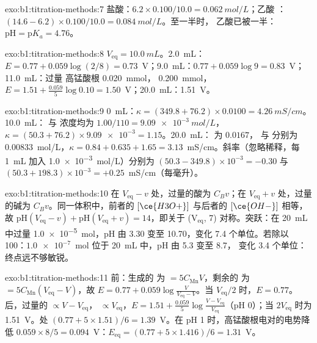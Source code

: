 \begin{solution}{exo:b1:titration-methods:7}
盐酸：$6.2 \times 0.100/10.0 = \qty{0.062}{mol/L}$；乙酸
：$(14.6 - 6.2) \times 0.100/10.0 = \qty{0.084}{mol/L}$。至一半时，
乙酸已被一半：$\mathrm{pH} = \mathrm{p}K_a = 4.76$。
\end{solution}

\begin{solution}{exo:b1:titration-methods:8}
$V_{\mathrm{eq}} = \qty{10.0}{mL}$。2.0~mL：$E = 0.77 + 0.059\log(2/8) =
0.73$~V；9.0~mL：$0.77 + 0.059\log 9 = 0.83$~V；11.0~mL：过量
高锰酸根 \qty{0.020}{mmol}， \qty{0.200}{mmol}，$E = 1.51 +
\frac{0.059}{5}\log 0.10 = 1.50$~V；20.0~mL：1.51~V。
\end{solution}

\begin{solution}{exo:b1:titration-methods:9}
0~mL：$\kappa = (349.8 + 76.2) \times 0.0100 = \qty{4.26}{mS/cm}$。
10.0~mL： 与  浓度均为 $1.00/110 = \qty{9.09e-3}{mol/L}$，
$\kappa = (50.3 + 76.2) \times \num{9.09e-3} = 1.15$。20.0~mL：
为 $0.0167$， 与  分别为 $0.00833$~mol/L，$\kappa = 0.84 + 0.635 + 1.65
= 3.13$~mS/cm。斜率（忽略稀释，每 \qty{1}{mL} 加入
\qty{1.0e-3}{mol/L}）分别为 $(50.3 - 349.8) \times 10^{-3} = -0.30$ 与
$(50.3 + 198.3) \times 10^{-3} = +0.25$~mS/cm（每毫升）。
\end{solution}

\begin{solution}{exo:b1:titration-methods:10}
在 $V_{\mathrm{eq}} - v$ 处，过量的酸为 $C_Bv$；在 $V_{\mathrm{eq}} + v$
处，过量的碱为 $C_Bv$。同一体积中，前者的 $[\ce{H3O+}]$ 与后者的
$[\ce{OH-}]$ 相等，故 $\mathrm{pH}(V_{\mathrm{eq}} - v) +
\mathrm{pH}(V_{\mathrm{eq}} + v) = 14$，即关于 (V$_{\mathrm{eq}}$,
7) 对称。突跃：在 \qty{20}{mL} 中过量 \qty{1.0e-5}{mol}，pH 由 3.30 变至 10.70，变化 7.4
个单位。若除以 100：$\num{1.0e-7}$~mol 位于 \qty{20}{mL} 中，pH 由 5.3 变至 8.7，
变化 3.4 个单位：终点远不够敏锐。
\end{solution}

\begin{solution}{exo:b1:titration-methods:11}
前：生成的  为 $= 5C_{\mathrm{Mn}}V$，剩余的  为 $=
5C_{\mathrm{Mn}}(V_{\mathrm{eq}} - V)$，故 $E = 0.77 + 0.059\log\frac{V}{V_{\mathrm{eq}}
- V}$。当 $V_{\mathrm{eq}}/2$ 时，$E = 0.77$。后，过量的  $\propto
V - V_{\mathrm{eq}}$， $\propto V_{\mathrm{eq}}$，$E = 1.51 +
\frac{0.059}{5}\log\frac{V - V_{\mathrm{eq}}}{V_{\mathrm{eq}}}$（pH 0）；当
$2V_{\mathrm{eq}}$ 时为 1.51~V。处 $(0.77 + 5 \times 1.51)/6 =
1.39$~V。在 pH 1 时，高锰酸根电对的电势降低 $0.059 \times 8/5 =
0.094$~V：$E_{\mathrm{eq}} = (0.77 + 5 \times 1.416)/6 = 1.31$~V。
\end{solution}

